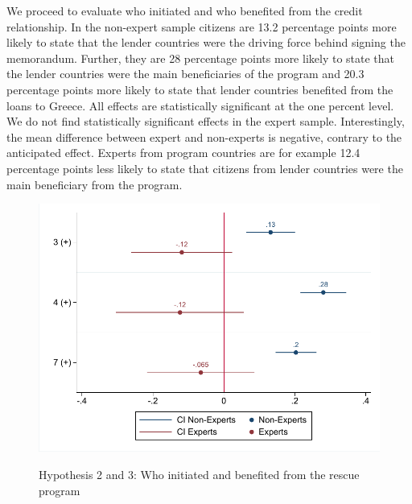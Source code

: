  We proceed to evaluate who initiated and who benefited from the credit relationship. 
In the non-expert sample citizens are 13.2 percentage points more likely to state that the lender countries were the driving force behind signing the memorandum. Further, they are 28 percentage points more likely to state that the lender countries were the main beneficiaries of the program and 20.3 percentage points more likely to state that lender countries benefited from the loans to Greece. All effects are statistically significant at the one percent level. We do not find statistically significant effects in the expert sample. Interestingly, the mean difference between expert and non-experts is negative, contrary to the anticipated effect. Experts from program countries are for example 12.4 percentage points less likely to state that citizens from lender countries were the main beneficiary from the program.\\
\begin{figure}[h!] 
\begin{center}
     \caption{Hypothesis 2 and 3: Who initiated and benefited from the rescue program}
     \includegraphics[scale=0.8]{Question3_base.pdf}
     \label{fig:my_label}
     \end{center}
     \tiny
\end{figure}

